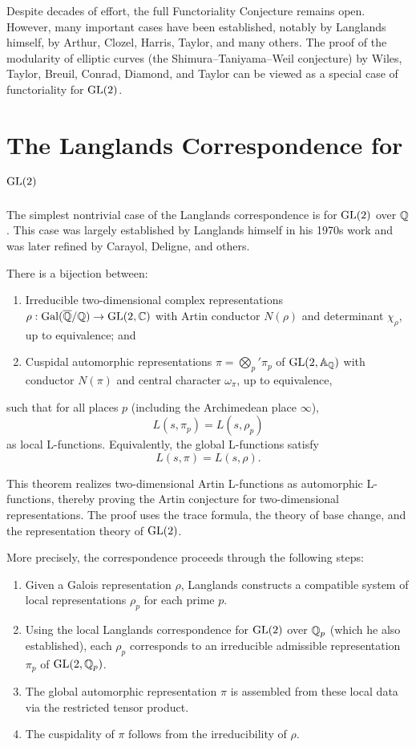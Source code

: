 Despite decades of effort, the full Functoriality Conjecture remains open. However, many important cases have been established, notably by Langlands himself, by Arthur, Clozel, Harris, Taylor, and many others. The proof of the modularity of elliptic curves (the Shimura--Taniyama--Weil conjecture) by Wiles, Taylor, Breuil, Conrad, Diamond, and Taylor can be viewed as a special case of functoriality for \(\operatorname{GL}(2)\).

\section{The Langlands Correspondence for \texorpdfstring{\(\operatorname{GL}(2)\)}{GL(2)}}

The simplest nontrivial case of the Langlands correspondence is for \(\operatorname{GL}(2)\) over \(\mathbb{Q}\). This case was largely established by Langlands himself in his 1970s work and was later refined by Carayol, Deligne, and others.

\begin{theorem}
There is a bijection between:
\begin{enumerate}
\item Irreducible two-dimensional complex representations \(\rho : \operatorname{Gal}(\overline{\mathbb{Q}}/\mathbb{Q}) \to \operatorname{GL}(2,\mathbb{C})\) with Artin conductor \(N(\rho)\) and determinant \(\chi_\rho\), up to equivalence; and
\item Cuspidal automorphic representations \(\pi = \bigotimes_p' \pi_p\) of \(\operatorname{GL}(2,\mathbb{A}_{\mathbb{Q}})\) with conductor \(N(\pi)\) and central character \(\omega_\pi\), up to equivalence,
\end{enumerate}
such that for all places \(p\) (including the Archimedean place \(\infty\)),
\[
L(s,\pi_p) = L(s,\rho_p)
\]
as local L-functions. Equivalently, the global L-functions satisfy
\[
L(s,\pi) = L(s,\rho).
\]
\end{theorem}

This theorem realizes two-dimensional Artin L-functions as automorphic L-functions, thereby proving the Artin conjecture for two-dimensional representations. The proof uses the trace formula, the theory of base change, and the representation theory of \(\operatorname{GL}(2)\).

More precisely, the correspondence proceeds through the following steps:
\begin{enumerate}
\item Given a Galois representation \(\rho\), Langlands constructs a compatible system of local representations \(\rho_p\) for each prime \(p\).
\item Using the local Langlands correspondence for \(\operatorname{GL}(2)\) over \(\mathbb{Q}_p\) (which he also established), each \(\rho_p\) corresponds to an irreducible admissible representation \(\pi_p\) of \(\operatorname{GL}(2,\mathbb{Q}_p)\).
\item The global automorphic representation \(\pi\) is assembled from these local data via the restricted tensor product.
\item The cuspidality of \(\pi\) follows from the irreducibility of \(\rho\).
\end{enumerate}

